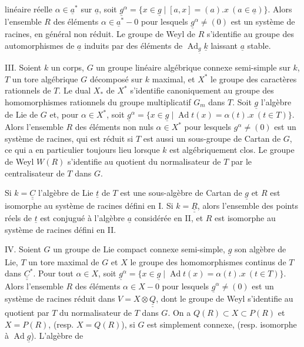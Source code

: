linéaire réelle $\alpha\in\underline{a}^*$ sur $\underline{a}$, soit $\underline{g}^{\alpha}=\{x\in\underline{g}\mid[a,x]=(a).x\ (a\in\underline{a})\}$. Alors l'ensemble $R$ des éléments $\alpha\in\underline{a}^*-0$ pour lesquels $\underline{g}^{\alpha}\neq(0)$ est un système de racines, en général non réduit. Le groupe de Weyl de $R$ s'identifie au groupe des automorphismes de $\underline{a}$ induits par des éléments de $\operatorname{Ad}_{\underline{g}}\underline{k}$ laissant $\underline{a}$ stable.

III. Soient $k$ un corps, $G$ un groupe linéaire algébrique connexe semi-simple sur $k$, $T$ un tore algébrique  $G$ décomposé sur $k$ maximal, et $X^*$ le groupe des caractères rationnels de $T$. Le dual $X_*$ de $X^*$ s'identifie canoniquement au groupe des homomorphismes rationnels du groupe multiplicatif $G_m$ dans $T$. Soit $\underline{g}$ l'algèbre de Lie de $G$ et, pour $\alpha\in X^*$, soit $\underline{g}^{\alpha}=\{x\in\underline{g}\mid\operatorname{Ad}t(x)=\alpha(t).x\ (t\in T)\}$. Alors l'ensemble $R$ des éléments non nuls $\alpha\in X^*$ pour lesquels $g^{\alpha}\neq(0)$ est un système de racines, qui est réduit si $T$ est aussi un sous-groupe de Cartan de $G$, ce qui a en particulier toujours lieu lorsque $k$ est algébriquement clos. Le groupe de Weyl $W(R)$ s'identifie au quotient du normalisateur de $T$ par le centralisateur de $T$ dans $G$.

Si $k=\underline{\underline{C}}$ l'algèbre de Lie $\underline{t}$ de $T$ est une sous-algèbre de Cartan de $\underline{g}$ et $R$ est isomorphe au système de racines défini en I. Si $k=\underline{\underline{R}}$, alors l'ensemble des points réels de $\underline{t}$ est conjugué à l'algèbre $\underline{a}$ considérée en II, et $R$ est isomorphe au système de racines défini en II.

IV. Soient $G$ un groupe de Lie compact connexe semi-simple, $\underline{g}$ son algèbre de Lie, $T$ un tore maximal de $G$ et $X$ le groupe des homomorphismes continus de $T$ dans $\underline{\underline{C}}^*$. Pour tout $\alpha\in X$, soit $\underline{g}^{\alpha}=\{x\in\underline{g}\mid\operatorname{Ad}t(x)=\alpha(t).x\ (t\in T)\}$. Alors l'ensemble $R$ des éléments $\alpha\in X-0$ pour lesquels $\underline{g}^{\alpha}\neq(0)$ est un système de racines réduit dans $V=X\otimes\underline{\underline{Q}}$, dont le groupe de Weyl s'identifie au quotient par $T$ du normalisateur de $T$ dans $G$. On a $Q(R)\subset X\subset P(R)$ et $X=P(R)$, (resp. $X=Q(R)$), si $G$ est simplement connexe, (resp. isomorphe à $\operatorname{Ad}\underline{g}$). L'algèbre de

